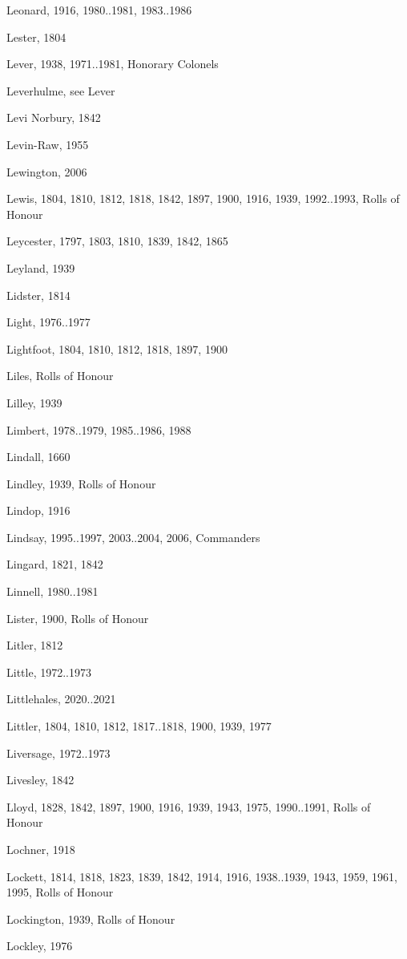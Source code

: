 {\begin{theindex}
\item Leonard, 1916, 1980..1981, 1983..1986
\item Lester, 1804
\item Lever, 1938, 1971..1981, Honorary Colonels
\item Leverhulme, see Lever
\item Levi Norbury, 1842
\item Levin-Raw, 1955
\item Lewington, 2006
\item Lewis, 1804, 1810, 1812, 1818, 1842, 1897, 1900, 1916, 1939, 1992..1993, Rolls of Honour
\item Leycester, 1797, 1803, 1810, 1839, 1842, 1865
\item Leyland, 1939
\item Lidster, 1814
\item Light, 1976..1977
\item Lightfoot, 1804, 1810, 1812, 1818, 1897, 1900
\item Liles, Rolls of Honour
\item Lilley, 1939
\item Limbert, 1978..1979, 1985..1986, 1988
\item Lindall, 1660
\item Lindley, 1939, Rolls of Honour
\item Lindop, 1916
\item Lindsay, 1995..1997, 2003..2004, 2006, Commanders
\item Lingard, 1821, 1842
\item Linnell, 1980..1981
\item Lister, 1900, Rolls of Honour
\item Litler, 1812
\item Little, 1972..1973
\item Littlehales, 2020..2021
\item Littler, 1804, 1810, 1812, 1817..1818, 1900, 1939, 1977
\item Liversage, 1972..1973
\item Livesley, 1842
\item Lloyd, 1828, 1842, 1897, 1900, 1916, 1939, 1943, 1975, 1990..1991, Rolls of Honour
\item Lochner, 1918
\item Lockett, 1814, 1818, 1823, 1839, 1842, 1914, 1916, 1938..1939, 1943, 1959, 1961, 1995, Rolls of Honour
\item Lockington, 1939, Rolls of Honour
\item Lockley, 1976

\end{theindex}}
